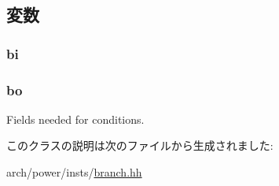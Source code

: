 \subsection{変数}
\hypertarget{classPowerISA_1_1BranchCond_a21f21d7a16aa8a182a445666cee1ea99}{
\subsubsection[{bi}]{ {\bf bi}}}
\label{classPowerISA_1_1BranchCond_a21f21d7a16aa8a182a445666cee1ea99}
\hypertarget{classPowerISA_1_1BranchCond_a1d1969bd4c3c3e860a3a647b324ff225}{
\subsubsection[{bo}]{ {\bf bo}}}
\label{classPowerISA_1_1BranchCond_a1d1969bd4c3c3e860a3a647b324ff225}


Fields needed for conditions. 

このクラスの説明は次のファイルから生成されました:\begin{DoxyCompactItemize}
\item 
arch/power/insts/\hyperlink{power_2insts_2branch_8hh}{branch.hh}\end{DoxyCompactItemize}
